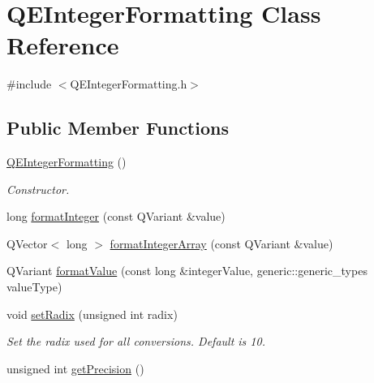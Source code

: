 \hypertarget{classQEIntegerFormatting}{
\section{QEIntegerFormatting Class Reference}
\label{classQEIntegerFormatting}
}


{\ttfamily \#include $<$QEIntegerFormatting.h$>$}

\subsection*{Public Member Functions}
\begin{DoxyCompactItemize}
\item 
\hypertarget{classQEIntegerFormatting_a5f4eac5f9dd4298891c75c54b807d73e}{
\hyperlink{classQEIntegerFormatting_a5f4eac5f9dd4298891c75c54b807d73e}{QEIntegerFormatting} ()}
\label{classQEIntegerFormatting_a5f4eac5f9dd4298891c75c54b807d73e}

\begin{DoxyCompactList}\small\item\em Constructor. \end{DoxyCompactList}\item 
long \hyperlink{classQEIntegerFormatting_a9e67ab8bd667549d256529329cf7bb42}{formatInteger} (const QVariant \&value)
\item 
QVector$<$ long $>$ \hyperlink{classQEIntegerFormatting_abb1e2dd15e3797e2aa5022d3b5043e74}{formatIntegerArray} (const QVariant \&value)
\item 
QVariant \hyperlink{classQEIntegerFormatting_adba4f788d19732bd676508b25e3a4132}{formatValue} (const long \&integerValue, generic::generic\_\-types valueType)
\item 
\hypertarget{classQEIntegerFormatting_af33894b001f9a77a0d6026780edb3a2f}{
void \hyperlink{classQEIntegerFormatting_af33894b001f9a77a0d6026780edb3a2f}{setRadix} (unsigned int radix)}
\label{classQEIntegerFormatting_af33894b001f9a77a0d6026780edb3a2f}

\begin{DoxyCompactList}\small\item\em Set the radix used for all conversions. Default is 10. \end{DoxyCompactList}\item 
\hypertarget{classQEIntegerFormatting_a420b7a7123d13da9d1ee89b0705b0649}{
unsigned int \hyperlink{classQEIntegerFormatting_a420b7a7123d13da9d1ee89b0705b0649}{getPrecision} ()}
\label{classQEIntegerFormatting_a420b7a7123d13da9d1ee89b0705b0649}


\end{DoxyCompactItemize}
